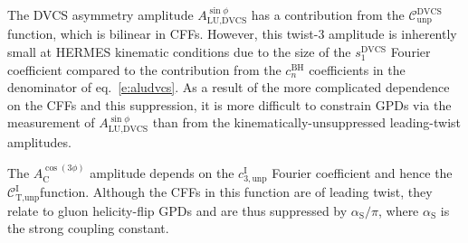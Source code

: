 The DVCS asymmetry amplitude $A^{\sin\phi}_{\textrm{LU,DVCS}}$ has a
contribution from the $\mathcal{C}_{\textrm{unp}}^{\textrm{DVCS}}$\red{-}function,
which is bilinear in CFFs. However, this twist-3 amplitude is inherently small at HERMES kinematic conditions due to the size of the $s_{1}^{\textrm{DVCS}}$ Fourier coefficient compared to the contribution from the $c_{n}^{\textrm{BH}}$ coefficients in the denominator of eq.~\ref{e:aludvcs}. As a result of
the more complicated dependence on the CFFs and this suppression, it
is more difficult to constrain GPDs
via the measurement of $A^{\sin\phi}_{\textrm{LU,DVCS}}$ than from the
kinematically-unsuppressed leading-twist amplitudes.

The $A^{\cos(3\phi)}_{\textrm{C}}$ amplitude depends on the
$c_{3,\textrm{unp}}^{\textrm{I}}$ Fourier coefficient and hence the
$\mathcal{C}_{\textrm{T,unp}}^{\textrm{I}}$\red{-}function. Although the CFFs
in this function are of leading twist, they relate to gluon helicity-flip GPDs and are thus suppressed by $\alpha_{\textrm{S}}/\pi$,
where $\alpha_{\textrm{S}}$ is the strong coupling constant.
